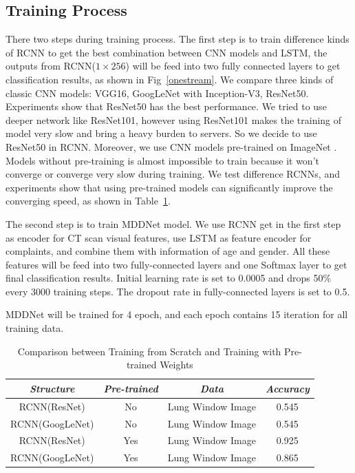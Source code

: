 \documentclass[journal]{IEEEtran}
\begin{document}
\subsection{Training Process}
\label{trainingprocess}
There two steps during training process.
The first step is to train difference kinds of RCNN to get the best combination between CNN models and LSTM, the outputs from RCNN($1 \times 256$) will be feed into two fully connected layers to get classification results, as shown in Fig~\ref{onestream}. We compare three kinds of classic CNN models: VGG16, GoogLeNet with Inception-V3, ResNet50. Experiments show that ResNet50 has the best performance. We tried to use deeper network like ResNet101, however using ResNet101 makes the training of model very slow and bring a heavy burden to servers. So we decide to use ResNet50 in RCNN. Moreover, we use CNN models pre-trained on ImageNet \cite{ILSVRC15}. Models without pre-training is almost impossible to train because it won't converge or converge very slow during training. We test difference RCNNs, and experiments show that using pre-trained models can significantly improve the converging speed, as shown in Table~\ref{pretrain}.

The second step is to train MDDNet model. We use RCNN get in the first step as encoder for CT scan visual features, use LSTM as feature encoder for complaints, and combine them with information of age and gender. All these features will be feed into two fully-connected layers and one Softmax layer to get final classification results. Initial learning rate is set to 0.0005 and drops 50\% every 3000 training steps. The dropout rate in fully-connected layers is set to 0.5.

MDDNet will be trained for 4 epoch, and each epoch contains 15 iteration for all training data.

\begin{table}[htb]
    \vspace{-0cm}
    \caption{Comparison between Training from Scratch and Training with Pre-trained Weights}
    \vspace{-0cm}
    \begin{center}
        \begin{tabular}{|c|c|c|c|}
        \hline
        \textbf{\textit{Structure}} & \textbf{\textit{Pre-trained}} & \textbf{\textit{Data}}& \textbf{\textit{Accuracy}}  \\
        \hline
        RCNN(ResNet) &No & Lung Window Image & 0.545\\
        RCNN(GoogLeNet) & No & Lung Window Image & 0.545\\
        RCNN(ResNet) & Yes & Lung Window Image & 0.925\\
        RCNN(GoogLeNet) & Yes & Lung Window Image & 0.865\\
        
        \hline
        \end{tabular}
    \vspace{-0cm}
    \label{pretrain}
    \end{center}
    \vspace{-0cm}
    \end{table}
\end{document}
